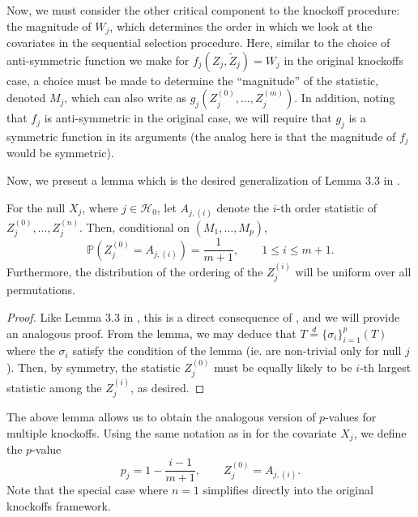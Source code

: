 Now, we must consider the other critical component to the knockoff procedure: the magnitude of $W_j$, which determines the order in which we look at the covariates in the sequential selection procedure. Here, similar to the choice of anti-symmetric function we make for $f_j(Z_j, \tilde{Z}_j) = W_j$ in the original knockoffs case, a choice must be made to determine the ``magnitude'' of the statistic, denoted $M_j$, which can also write as $g_j(Z^{(0)}_j,\ldots, Z^{(m)}_j)$. In addition, noting that $f_j$ is anti-symmetric in the original case, we will require that $g_j$ is a symmetric function in its arguments (the analog here is that the magnitude of $f_j$ would be symmetric). 


Now, we present a lemma which is the desired generalization of Lemma 3.3 in \cite{panning}.
\begin{lem}
\label{lemma2.4}
For the null $X_j$, where $j \in \mathcal{H}_0$, let $A_{j, (i)}$ denote the $i$-th order statistic of $Z_j^{(0)}, \ldots, Z_j^{(n)}$. Then, conditional on $(M_1, \ldots, M_p)$,
\begin{equation}
\mathbb{P}\left(Z_j^{(0)} = A_{j, (i)} \right) = \frac{1}{m+1}, \qquad 1 \leq i \leq m + 1.
\end{equation}
Furthermore, the distribution of the ordering of the $Z_j^{(i)}$ will be uniform over all permutations.
\end{lem}
\begin{proof}
Like Lemma 3.3 in \cite{panning}, this is a direct consequence of \hyperref[lemma2.3]{}, and we will provide an analogous proof. From the lemma, we may deduce that $T \overset{d}{=} \{ \sigma_i \}_{i=1}^p \left( T \right)$ where the $\sigma_i$ satisfy the condition of the lemma (ie. are non-trivial only for null $j$). Then, by symmetry, the statistic $Z_j^{(0)}$ must be equally likely to be $i$-th largest statistic among the $Z_j^{(i)}$, as desired.
\end{proof}
The above lemma allows us to obtain the analogous version of $p$-values for multiple knockoffs. Using the same notation as in \hyperref[lemma2.4]{} for the covariate $X_j$, we define the $p$-value
\begin{equation}
p_j = 1 - \frac{i - 1}{m+1}, \qquad Z_j^{(0)} = A_{j, (i)}.
\end{equation}
Note that the special case where $n = 1$ simplifies directly into the original knockoffs framework.

